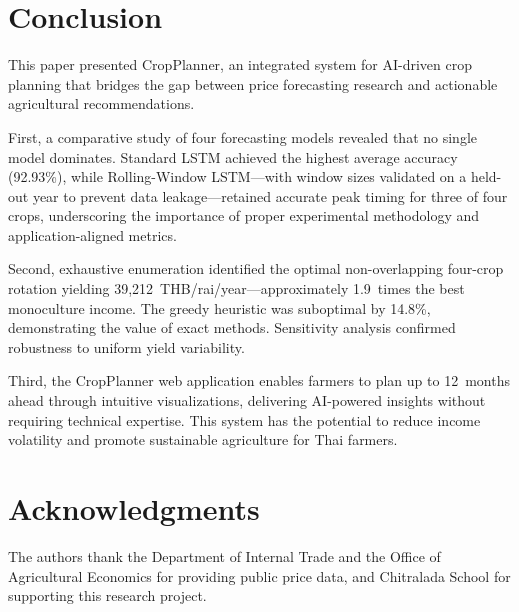 \documentclass[conference]{IEEEtran}
\begin{document}
\section{Conclusion}

This paper presented CropPlanner, an integrated system for AI-driven crop planning that bridges the gap between price forecasting research and actionable agricultural recommendations.

First, a comparative study of four forecasting models revealed that no single model dominates. Standard LSTM achieved the highest average accuracy (92.93\%), while Rolling-Window LSTM---with window sizes validated on a held-out year to prevent data leakage---retained accurate peak timing for three of four crops, underscoring the importance of proper experimental methodology and application-aligned metrics.

Second, exhaustive enumeration identified the optimal non-overlapping four-crop rotation yielding 39,212~THB/rai/year---approximately 1.9~times the best monoculture income. The greedy heuristic was suboptimal by 14.8\%, demonstrating the value of exact methods. Sensitivity analysis confirmed robustness to uniform yield variability.

Third, the CropPlanner web application enables farmers to plan up to 12~months ahead through intuitive visualizations, delivering AI-powered insights without requiring technical expertise. This system has the potential to reduce income volatility and promote sustainable agriculture for Thai farmers.

\section*{Acknowledgments}

The authors thank the Department of Internal Trade and the Office of Agricultural Economics for providing public price data, and Chitralada School for supporting this research project.
\end{document}
